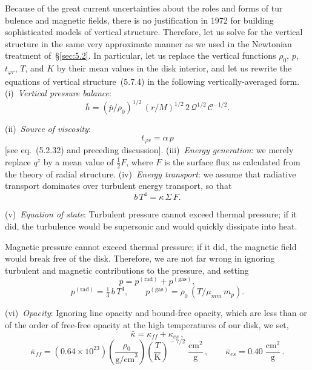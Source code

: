 Because of the great current uncertainties about the roles and forms of tur%
bulence and magnetic fields, there is no justification in 1972 for building
sophisticated models of vertical structure.  Therefore, let us solve for the
vertical structure in the same very approximate manner as we used in the
Newtonian treatment of~\S\ref{sec:5.2}.  In particular, let us replace the vertical functions
$\rho_0$, $p$, $t_{\varphi r}$, $T$, and $K$ by their mean values in the disk interior, and let us rewrite
the equations of vertical structure~(5.7.4) in the following vertically-averaged
form.  (i)~\textit{Vertical pressure balance}:
%
\begin{equation}
\tag{5.8.1a}
\bar{h}
= (\bar{p}/\rho_0)^{1/2}\,(r/M)^{1/2}\,2\,\mathscr{Q}^{1/2}\,\mathscr{C}^{-1/2}.
\end{equation}

(ii)~\textit{Source of viscosity}:
%
\begin{equation}
\tag{5.8.1b}
t_{\varphi r} = \alpha\, p
\end{equation}
%
[see eq.~(5.2.32) and preceding discussion].  (iii)~\textit{Energy generation}: we merely
replace $q^z$ by a mean value of $\frac{1}{2}F$, where $F$ is the surface flux as calculated from
the theory of radial structure.  (iv)~\textit{Energy transport}: we assume that radiative
transport dominates over turbulent energy transport, so that
%
\begin{equation}
\tag{5.8.1c}
b\,T^4 = \kappa\,\Sigma\, F.
\end{equation}

(v)~\textit{Equation of state}: Turbulent pressure cannot exceed thermal pressure; if it
did, the turbulence would be supersonic and would quickly dissipate into heat.


Magnetic pressure cannot exceed thermal pressure; if it did, the magnetic field
would break free of the disk.  Therefore, we are not far wrong in ignoring
turbulent and magnetic contributions to the pressure, and setting
%
\begin{equation}
\tag{5.8.1d}
p = p^{(\text{rad})} + p^{(\text{gas})},
\end{equation}
%
\begin{equation}
p^{(\text{rad})} = \tfrac{1}{3}\,b\,T^4, \qquad
p^{(\text{gas})} = \rho_0\,(T/\mu_{mm}\, m_p).
\end{equation}

(vi)~\textit{Opacity}: Ignoring line opacity and bound-free opacity, which are less than
or of the order of free-free opacity at the high temperatures of our disk, we set,
%
\begin{equation}
\tag{5.8.1e}
\bar{\kappa} = \kappa_{ff} + \kappa_{es}\,,
\end{equation}
%
\begin{equation}
\bar{\kappa}_{ff}
= (0.64 \times 10^{23})
  \left(\frac{\rho_0}{\text{g/cm}^3}\right)
  \left(\frac{T}{\text{K}}\right)^{\!-7/2}
  \;\frac{\text{cm}^2}{\text{g}}\,,
\qquad
\bar{\kappa}_{es} = 0.40\;\frac{\text{cm}^2}{\text{g}}\,.
\end{equation}


